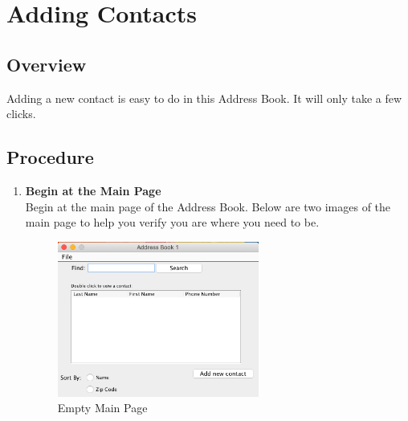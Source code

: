 \documentclass[a4paper, 11pt]{article}
\begin{document}
\clearpage

\section{Adding Contacts}
\subsection{Overview}
Adding a new contact is easy to do in this Address Book. It will only take a few clicks.
\subsection{Procedure}
\begin{enumerate}[label=\textbf{\arabic*})]
    \item{\textbf{Begin at the Main Page}}\\ Begin at the main page of the Address Book. Below are two images of the main page to help you verify you are where you need to be.
    
    \begin{figure}[h!]
    \centering
      \includegraphics[width=250]{main_page_empty.png}
      \caption{Empty Main Page}
    \end{figure}


\end{enumerate}
\end{document}
